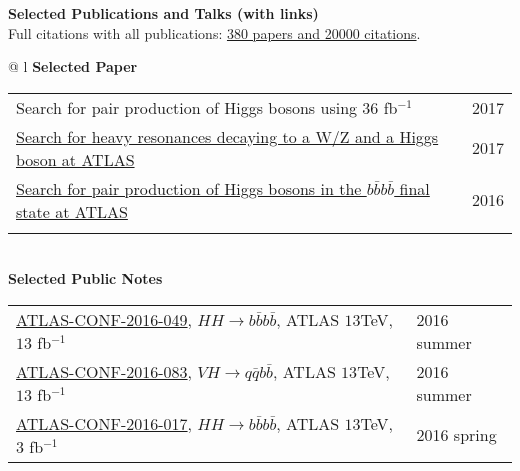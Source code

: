 \documentclass[letterpaper,11pt,oneside]{article}
\newcommand{\blue}[1]{\textcolor[rgb]{0,0,0.9}{#1}}
\begin{document}
\newpage
\raggedright
 \textbf{\Large{Selected Publications and Talks (with links)}} \\
 Full citations with all publications: \blue{\href{https://labs.inspirehep.net/authors/1320491}{380 papers and 20000 citations}}.
\vspace{-0.5cm}
\normalsize
\begin{flushleft}
\hspace{1cm}
 \begin{tabular}{@{} l}
    \textbf{Selected Paper} \\ 
    \begin{tabular}{@{} l l }
    Search for pair production of Higgs bosons using $36$ fb$^{-1}$ & 2017 \\
    \blue{\href{http://arxiv.org/abs/1606.04782}{Search for heavy resonances decaying to a W/Z and a Higgs boson at ATLAS}} & 2017 \\
    \blue{\href{http://arxiv.org/abs/1606.04782}{Search for pair production of Higgs bosons in the $b\bar{b}b\bar{b}$ final state at ATLAS}} & 2016 \\
    \hspace{0.8\linewidth} & \hspace{0.1\linewidth} \\
     \end{tabular}
     \\
    \textbf{Selected Public Notes} \\ 
    \begin{tabular}{@{} l l }
    \blue{\href{https://atlas.web.cern.ch/Atlas/GROUPS/PHYSICS/CONFNOTES/ATLAS-CONF-2016-049/}{ATLAS-CONF-2016-049}}, $HH\to  b\bar{b}b\bar{b}$, ATLAS $13$TeV, $13$ fb$^{-1}$ & 2016 summer\\
    \blue{\href{https://atlas.web.cern.ch/Atlas/GROUPS/PHYSICS/CONFNOTES/ATLAS-CONF-2016-083/}{ATLAS-CONF-2016-083}}, $VH\to  q\bar{q}b\bar{b}$, ATLAS $13$TeV, $13$ fb$^{-1}$ & 2016 summer\\
    \blue{\href{https://atlas.web.cern.ch/Atlas/GROUPS/PHYSICS/CONFNOTES/ATLAS-CONF-2016-017/}{ATLAS-CONF-2016-017}}, $HH\to  b\bar{b}b\bar{b}$, ATLAS $13$TeV, $3$ fb$^{-1}$ & 2016 spring\\
    

\end{tabular}
\end{tabular}
\end{flushleft}
\end{document}
